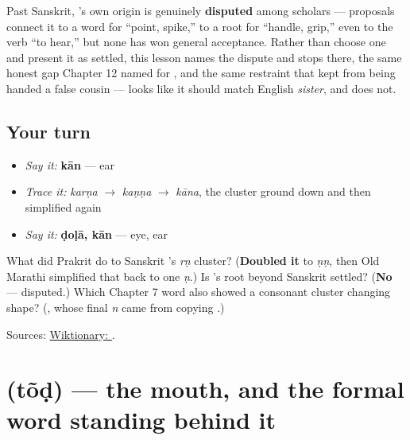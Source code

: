 \begin{cousinweb}
Past Sanskrit, \textbf{}'s own origin is genuinely \textbf{disputed} among scholars — proposals connect it to a word for \textquotedblleft{}point, spike,\textquotedblright{} to a root for \textquotedblleft{}handle, grip,\textquotedblright{} even to the verb \textquotedblleft{}to hear,\textquotedblright{} but none has won general acceptance. Rather than choose one and present it as settled, this lesson names the dispute and stops there, the same honest gap Chapter 12 named for \textbf{}, and the same restraint that kept \textbf{} from being handed a false cousin — \textbf{} looks like it should match English \emph{sister}, and does not.
\end{cousinweb}

\subsection*{Your turn}
\begin{itemize}
\raggedright
  \item \emph{Say it:} \textbf{kān} — ear
  \item \emph{Trace it:} \emph{karṇa} $\to$ \emph{kaṇṇa} $\to$ \emph{kāna}, the cluster ground down and then simplified again
  \item \emph{Say it:} \textbf{ḍoḷā, kān} — eye, ear
\end{itemize}

\begin{tcolorbox}[breakable,colback=teal!4,colframe=teal!35!black,title={Before you move on}]
What did Prakrit do to Sanskrit \textbf{}'s \emph{rṇ} cluster? (\textbf{Doubled it} to \emph{ṇṇ}, then Old Marathi simplified that back to one \emph{ṇ}.) Is \textbf{}'s root beyond Sanskrit settled? (\textbf{No} — disputed.) Which Chapter 7 word also showed a consonant cluster changing shape? (\textbf{}, whose final \emph{n} came from copying \textbf{}.)

Sources: \href{https://en.wiktionary.org/wiki/\%E0\%A4\%95\%E0\%A4\%BE\%E0\%A4\%A8}{Wiktionary: }.
\end{tcolorbox}
\section[tõḍ]{ (tõḍ) — the mouth, and the formal word standing behind it}

\label{lesson:MR-C12-tond}



